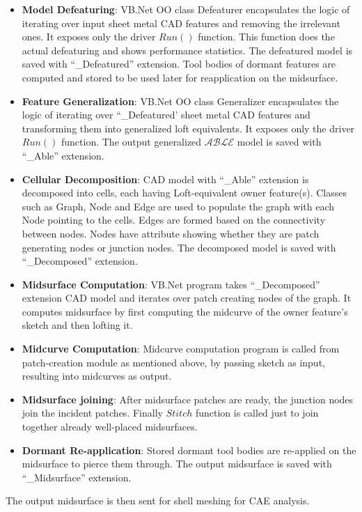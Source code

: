 \begin{itemize}
\item \textbf{Model Defeaturing}: VB.Net OO class Defeaturer encapsulates the logic of iterating over input sheet metal CAD features and removing the irrelevant ones. It exposes only the driver $Run()$ function. This function does the actual defeaturing and shows performance statistics. The defeatured model is saved with ``\_Defeatured'' extension. Tool bodies of dormant features are computed and stored to be used later for reapplication on the midsurface.
\item \textbf{Feature Generalization}: VB.Net OO class Generalizer encapsulates the logic of iterating over ``\_Defeatured' sheet metal CAD features and transforming them into generalized loft equivalents. It exposes only the driver $Run()$ function. The output generalized  $\mathcal{ABLE}$  model is saved with ``\_Able'' extension.
\item \textbf{Cellular Decomposition}: CAD model with ``\_Able'' extension is decomposed into cells, each having Loft-equivalent owner feature(s). Classes such as Graph, Node and Edge are used to populate the graph with each Node pointing to the cells. Edges are formed based on the connectivity between nodes. Nodes have attribute showing whether they are patch generating nodes or junction nodes.  The decomposed model is saved with ``\_Decomposed'' extension.
\item \textbf{Midsurface Computation}:  VB.Net program takes ``\_Decomposed'' extension CAD model and iterates over patch creating nodes of the graph. It computes midsurface by first computing the midcurve of the owner feature's sketch and then lofting it.
\item \textbf{Midcurve Computation}:  Midcurve computation program is called from patch-creation module as mentioned above, by passing sketch as input, resulting into midcurves as output.
\item \textbf{Midsurface joining}: After midsurface patches are ready, the junction nodes join the incident patches. Finally $Stitch$ function is called just to join together already well-placed midsurfaces.
\item \textbf{Dormant Re-application}: Stored dormant tool bodies are re-applied on the midsurface to pierce them through. The output midsurface is saved with ``\_Midsurface'' extension.
\end{itemize}

The output midsurface is then sent for shell meshing for CAE analysis.

